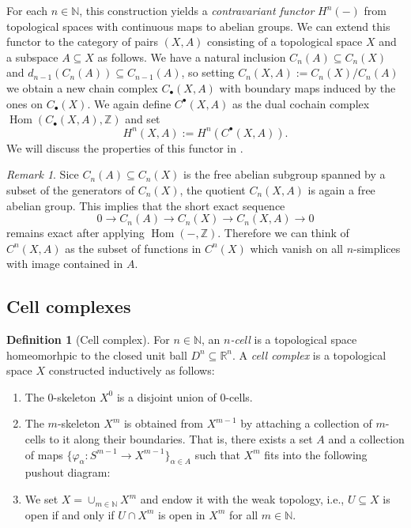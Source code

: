 \documentclass[12pt,a4paper]{amsart}
\theoremstyle{plain}
\theoremstyle{definition}
\newtheorem{defn}[thm]{Definition}
\theoremstyle{remark}
\newtheorem{rem}[thm]{Remark}
\begin{document}
For each $n \in \mathbb{N}$, this construction yields a \emph{contravariant functor} $H^{n}(-)$ from topological spaces with continuous maps to abelian groups.
We can extend this functor to the category of pairs $(X,A)$ consisting of a topological space $X$ and a subspace $A \subseteq X$ as follows.
We have a natural inclusion $C_{n}(A) \subseteq C_{n}(X)$ and $d_{n-1}(C_{n}(A)) \subseteq C_{n-1}(A)$, so setting $C_{n}(X,A) := C_{n}(X)/C_{n}(A)$ we obtain a new chain complex $C_{\bullet}(X,A)$ with boundary maps induced by the ones on $C_{\bullet}(X)$.
We again define $C^{\bullet}(X,A)$ as the dual cochain complex $\operatorname{Hom}(C_{\bullet}(X,A),\mathbb{Z})$ and set
\[ H^{n}(X,A) := H^{n}(C^{\bullet}(X,A)). \]
We will discuss the properties of this functor in .

\begin{rem}
  Sice $C_{n}(A) \subseteq C_{n}(X)$ is the free abelian subgroup spanned by a subset of the generators of $C_{n}(X)$, the quotient $C_{n}(X,A)$ is again a free abelian group.
  This implies that the short exact sequence
  \[ 0 \to C_{n}(A) \to C_{n}(X) \to C_{n}(X,A) \to 0 \]
  remains exact after applying $\operatorname{Hom}(-,\mathbb{Z})$.
  Therefore we can think of $C^{n}(X,A)$ as the subset of functions in $C^{n}(X)$ which vanish on all $n$-simplices with image contained in $A$.
\end{rem}

\subsection{Cell complexes}

\begin{defn}[Cell complex]
  For $n \in \mathbb{N}$, an \emph{$n$-cell} is a topological space homeomorhpic to the closed unit ball $D^{n} \subseteq \mathbb{R}^{n}$.
  A \emph{cell complex} is a topological space $X$ constructed inductively as follows:
  \begin{enumerate}
    \item The $0$-skeleton $X^{0}$ is a disjoint union of $0$-cells.
    \item The $m$-skeleton $X^{m}$ is obtained from $X^{m-1}$ by attaching a collection of $m$-cells to it along their boundaries.
      That is, there exists a set $A$ and a collection of maps $\{\varphi_{\alpha} \colon S^{m-1} \to X^{m-1}\}_{\alpha \in A}$ such that $X^{m}$ fits into the following pushout diagram:
      \begin{center}
      \end{center}
    \item We set $X = \cup_{m \in \mathbb{N}} X^{m}$ and endow it with the weak topology, i.e., $U \subseteq X$ is open if and only if $U \cap X^{m}$ is open in $X^{m}$ for all $m \in \mathbb{N}$.
  \end{enumerate}
\end{defn}
\end{document}
